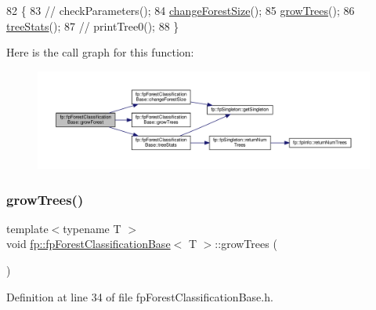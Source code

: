 \begin{DoxyCode}
82                              \{
83                 \textcolor{comment}{//  checkParameters();}
84                 \hyperlink{classfp_1_1fpForestClassificationBase_a696b361df0a1c9aa36687333e2d8111b}{changeForestSize}();
85                 \hyperlink{classfp_1_1fpForestClassificationBase_aea9db2571269f0f627226aa75ec4a694}{growTrees}();
86                 \hyperlink{classfp_1_1fpForestClassificationBase_a48567d379434daeccb1540c84674d286}{treeStats}();
87                 \textcolor{comment}{//  printTree0();}
88             \}
\end{DoxyCode}
Here is the call graph for this function\+:\nopagebreak
\begin{figure}[H]
\begin{center}
\leavevmode
\includegraphics[width=350pt]{classfp_1_1fpForestClassificationBase_a706225fdbef8c71fb022f4c3446b388d_cgraph}
\end{center}
\end{figure}
\mbox{\label{classfp_1_1fpForestClassificationBase_aea9db2571269f0f627226aa75ec4a694}} 
\subsubsection{\texorpdfstring{grow\+Trees()}{growTrees()}}
{\footnotesize\ttfamily template$<$typename T $>$ \\
void \hyperlink{classfp_1_1fpForestClassificationBase}{fp\+::fp\+Forest\+Classification\+Base}$<$ T $>$\+::grow\+Trees (\begin{DoxyParamCaption}{ }\end{DoxyParamCaption})\hspace{0.3cm}{\ttfamily [inline]}}



Definition at line 34 of file fp\+Forest\+Classification\+Base.\+h.


